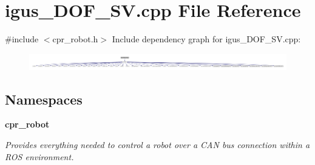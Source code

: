 \section{igus\+\_\+D\+O\+F\+\_\+\+S\+V.\+cpp File Reference}
\label{igus__5DOF__SV_8cpp}
{\ttfamily \#include $<$cpr\+\_\+robot.\+h$>$}\newline
Include dependency graph for igus\+\_\+D\+O\+F\+\_\+\+S\+V.\+cpp\+:
\nopagebreak
\begin{figure}[H]
\begin{center}
\leavevmode
\includegraphics[width=350pt]{igus__5DOF__SV_8cpp__incl}
\end{center}
\end{figure}
\subsection*{Namespaces}
\begin{DoxyCompactItemize}
\item 
 \textbf{ cpr\+\_\+robot}
\begin{DoxyCompactList}\small\item\em Provides everything needed to control a robot over a C\+AN bus connection within a R\+OS environment. \end{DoxyCompactList}\end{DoxyCompactItemize}
